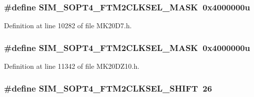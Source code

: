 \subsubsection[{\texorpdfstring{S\+I\+M\+\_\+\+S\+O\+P\+T4\+\_\+\+F\+T\+M2\+C\+L\+K\+S\+E\+L\+\_\+\+M\+A\+SK}{SIM_SOPT4_FTM2CLKSEL_MASK}}]{\setlength{\rightskip}{0pt plus 5cm}\#define S\+I\+M\+\_\+\+S\+O\+P\+T4\+\_\+\+F\+T\+M2\+C\+L\+K\+S\+E\+L\+\_\+\+M\+A\+SK~0x4000000u}\hypertarget{group___s_i_m___register___masks_ga8e9ace9af53ead470265ca2338402dae}{}\label{group___s_i_m___register___masks_ga8e9ace9af53ead470265ca2338402dae}


Definition at line 10282 of file M\+K20\+D7.\+h.

\subsubsection[{\texorpdfstring{S\+I\+M\+\_\+\+S\+O\+P\+T4\+\_\+\+F\+T\+M2\+C\+L\+K\+S\+E\+L\+\_\+\+M\+A\+SK}{SIM_SOPT4_FTM2CLKSEL_MASK}}]{\setlength{\rightskip}{0pt plus 5cm}\#define S\+I\+M\+\_\+\+S\+O\+P\+T4\+\_\+\+F\+T\+M2\+C\+L\+K\+S\+E\+L\+\_\+\+M\+A\+SK~0x4000000u}\hypertarget{group___s_i_m___register___masks_ga8e9ace9af53ead470265ca2338402dae}{}\label{group___s_i_m___register___masks_ga8e9ace9af53ead470265ca2338402dae}


Definition at line 11342 of file M\+K20\+D\+Z10.\+h.

\subsubsection[{\texorpdfstring{S\+I\+M\+\_\+\+S\+O\+P\+T4\+\_\+\+F\+T\+M2\+C\+L\+K\+S\+E\+L\+\_\+\+S\+H\+I\+FT}{SIM_SOPT4_FTM2CLKSEL_SHIFT}}]{\setlength{\rightskip}{0pt plus 5cm}\#define S\+I\+M\+\_\+\+S\+O\+P\+T4\+\_\+\+F\+T\+M2\+C\+L\+K\+S\+E\+L\+\_\+\+S\+H\+I\+FT~26}\hypertarget{group___s_i_m___register___masks_ga4b5b8e4dc00734623d8a16db8ff0510c}{}\label{group___s_i_m___register___masks_ga4b5b8e4dc00734623d8a16db8ff0510c}


